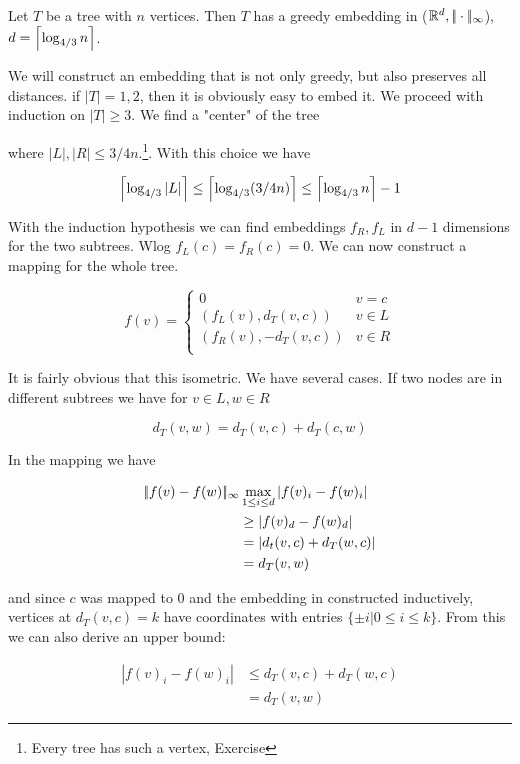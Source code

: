 \begin{thm} Let $T$ be a tree with $n$ vertices. Then $T$ has a greedy embedding in ($\mathbb{R}^d,|\!|\cdot|\!|_{\infty}$), $d=\left\lceil \log_{4/3}n \right\rceil$.
\end{thm}

\begin{pr} We will construct an embedding that is not only greedy, but also preserves all distances. if $|T|=1,2$, then it is obviously easy to embed it. We proceed with induction on $|T|\geq 3$. We find a "center" of the tree


where $|L|,|R| \leq 3/4n$.\footnote{Every tree has such a vertex, Exercise}. With this choice we have

\[\left\lceil \log_{4/3}|L| \right\rceil \leq \left\lceil \log_{4/3}(3/4n) \right\rceil \leq \left\lceil \log_{4/3}n \right\rceil-1\]

With the induction hypothesis we can find embeddings $f_R,f_L$ in $d-1$ dimensions for the two subtrees. Wlog $f_L(c) = f_R(c) = 0$. We can now construct a mapping for the whole tree.

\[f(v) = \begin{cases}
0& v=c\\
(f_L(v),d_T(v,c)) & v\in L\\
(f_R(v),-d_T(v,c)) & v\in R\\
\end{cases}\]

It is fairly obvious that this isometric. We have several cases. If two nodes are in different subtrees we have for $v\in L, w\in R$

\[d_T(v,w)=d_T(v,c)+d_T(c,w)\]

In the mapping we have

\begin{align*}
|\!|f(v)-f(w)|\!|_{\infty} & \max_{1\leq i\leq d} |f(v)_i-f(w)_i|\\
	&\geq |f(v)_d-f(w)_d|\\
	&= |d_t(v,c)+d_T(w,c)|\\
	&=d_T(v,w)
\end{align*}

and since $c$ was mapped to $0$ and the embedding in constructed inductively, vertices at $d_T(v,c)=k$ have coordinates with entries $\{\pm i | 0 \leq i\leq k\}$. From this we can also derive an upper bound:

\begin{align*}
|f(v)_i-f(w)_i| &\leq d_T(v,c)+d_T(w,c)\\
	&=d_T(v,w)
\end{align*}	


\end{pr}
